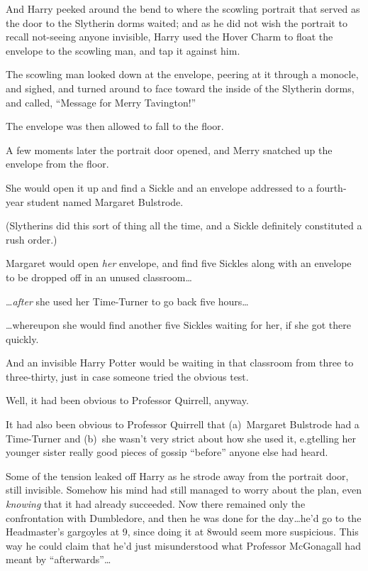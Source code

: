 And Harry peeked around the bend to where the scowling portrait that served as the door to the Slytherin dorms waited; and as he did not wish the portrait to recall not-seeing anyone invisible, Harry used the Hover Charm to float the envelope to the scowling man, and tap it against him.

The scowling man looked down at the envelope, peering at it through a monocle, and sighed, and turned around to face toward the inside of the Slytherin dorms, and called, “Message for Merry Tavington!”

The envelope was then allowed to fall to the floor.

A few moments later the portrait door opened, and Merry snatched up the envelope from the floor.

She would open it up and find a Sickle and an envelope addressed to a fourth-year student named Margaret Bulstrode.

(Slytherins did this sort of thing all the time, and a Sickle definitely constituted a rush order.)

Margaret would open \emph{her} envelope, and find five Sickles along with an envelope to be dropped off in an unused classroom…

…\emph{after} she used her Time-Turner to go back five hours…

…whereupon she would find another five Sickles waiting for her, if she got there quickly.

And an invisible Harry Potter would be waiting in that classroom from three \PM to three-thirty, just in case someone tried the obvious test.

Well, it had been obvious to Professor Quirrell, anyway.

It had also been obvious to Professor Quirrell that (a)~Margaret Bulstrode had a Time-Turner and (b)~she wasn’t very strict about how she used it, e.g\. telling her younger sister really good pieces of gossip “before” anyone else had heard.

Some of the tension leaked off Harry as he strode away from the portrait door, still invisible. Somehow his mind had still managed to worry about the plan, even \emph{knowing} that it had already succeeded. Now there remained only the confrontation with Dumbledore, and then he was done for the day…he’d go to the Headmaster’s gargoyles at 9\PM, since doing it at 8\PM would seem more suspicious. This way he could claim that he’d just misunderstood what Professor McGonagall had meant by “afterwards”…

